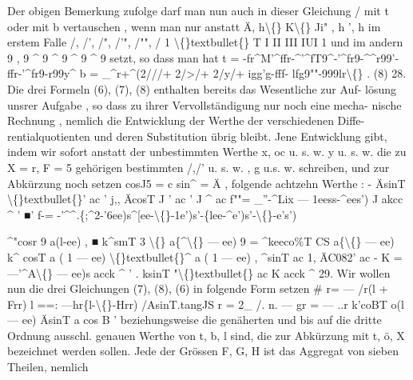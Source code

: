 \documentclass[12pt,a4paper]{article}
\begin{document}
Der  obigen  Bemerkung  zufolge  darf  man  nun  auch  in  dieser  Gleichung  /  mit  t oder  mit  b  vertauschen ,  wenn  man  nur anstatt  Ä,    h\textbackslash\{\}    K\textbackslash\{\}  Ji" ,    h  ',    h im  erstem  Falle  /,  /',  /",  /'",  /"",  / 1    \textbackslash\{\}textbullet\{\}                   T  I            II           III           IUI           1 und  im  andern  9 ,  9  \^{}  9  \^{}  9  \^{}  9   \^{}  9 setzt,  so  dass  man  hat t  =  -fr\^{}M'\^{}ffr-\^{}'\^{}fT9\^{}-'\^{}fr9-\^{}\^{}r99'-ffr-'\^{}fr9-r99y\^{} b  =  \_\^{}r+\^{}(2///+  2/>/+  2/y/+  igg'g-fff-  lfg9""-999lr\textbackslash\{\} .  (8) 28. Die  drei  Formeln  (6),  (7),  (8)  enthalten  bereits  das  Wesentliche  zur  Auf- lösung unsrer  Aufgabe ,  so  dass  zu  ihrer  Vervollständigung  nur  noch  eine  mecha- nische Rechnung ,  nemlich  die  Entwicklung  der  Werthe  der  verschiedenen  Diffe- rentialquotienten und  deren  Substitution  übrig  bleibt.  Jene  Entwicklung  gibt, indem  wir  sofort  anstatt  der  unbestimmten  Werthe  x,  oc  u.  s.  w.  y  u.  s.  w.  die  zu X  =  r,  F  =  5  gehörigen  bestimmten  /,/'  u.  s.  w. ,  g  u.s.  w.  schreiben,  und zur  Abkürzung  noch  setzen cosJ5  =  c sin\^{}  =  Ä  , folgende  achtzehn  Werthe : -         ÄsinT \textbackslash\{\}textbullet\{\}'  ac      ' j,,    ÄcosT J          '  ac     ' J  \^{}       ac f""=  \_''-\^{}Lix  ---  1eess-\^{}ees') J  akcc    \^{}  '  ■' f-=  -'\^{}\^{}.\{;\^{}2-'6ee)s\^{}[ee-\textbackslash\{\}-1e')s'-\{lee-\^{}e')s'-\textbackslash\{\}-e's')

\^{}"cosr 9       a(l-ee) ,          ■     k\^{}smT 3  \textbackslash\{\}    a\{\^{}\textbackslash\{\}  ---  ee) 9     = \^{}keeco\%T CS a\{\textbackslash\{\}  ---  ee) k\^{}  cosT a  ( 1  ---  ee) \textbackslash\{\}textbullet\{\}\^{}  a  ( 1  ---  ee) ,           \^{}sinT ac 1,            ÄC082' ac  - K  =---'\^{}A\textbackslash\{\}  ---  ee)s acck     \^{}  ' .    ksinT "\textbackslash\{\}textbullet\{\}        ac K acck     \^{} 29. Wir  wollen  nun  die  drei  Gleichungen    (7),  (8),  (6)  in  folgende  Form  setzen \#  r=  --- /r(l  +  Frr) l  ==:  ---hr\{l-\textbackslash\{\}-Hrr) /AsinT.tangJS r  =    2\_   /. n. ---  gr  =  ---   ..r k'coBT o(l --- ee) ÄsinT a  cos  B ' beziehungsweise  die  genäherten  und  bis  auf  die  dritte  Ordnung  ausschl.  genauen Werthe  von  t,  b,  l  sind,  die  zur  Abkürzung  mit  t,  ö,  X  bezeichnet  werden sollen.  Jede  der  Grössen  F,  G,  H  ist  das  Aggregat  von  sieben  Theilen, nemlich
\end{document}
